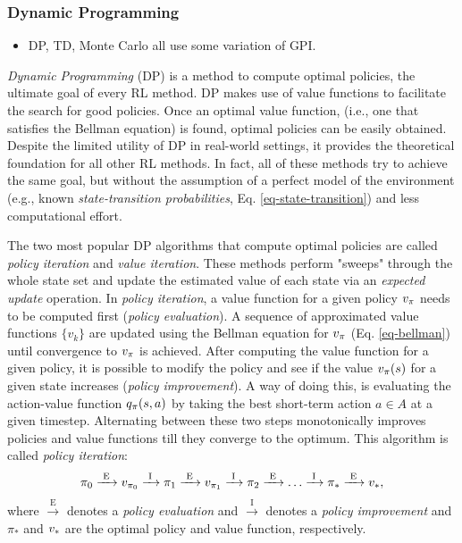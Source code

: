 \documentclass[a4paper, twoside, 12pt]{article}
\begin{document}
\subsubsection{Dynamic Programming}
\label{sec:org52f4b8e}
\begin{itemize}
\item DP, TD, Monte Carlo all use some variation of GPI.
\end{itemize}

\emph{Dynamic Programming} (DP) is a method to compute optimal policies, the ultimate
goal of every RL method. DP makes use of value functions to facilitate the
search for good policies. Once an optimal value function, (i.e., one that
satisfies the Bellman equation) is found, optimal policies can be easily
obtained. Despite the limited utility of DP in real-world settings, it provides
the theoretical foundation for all other RL methods. In fact, all of these
methods try to achieve the same goal, but without the assumption of a perfect
model of the environment (e.g., known \emph{state-transition probabilities}, Eq.
\ref{eq-state-transition}) and less computational effort.

The two most popular DP algorithms that compute optimal policies are called
\emph{policy iteration} and \emph{value iteration}. These methods perform "sweeps" through
the whole state set and update the estimated value of each state via an
\emph{expected update} operation. In \emph{policy iteration}, a value function for a given
policy \(v_\pi\) needs to be computed first (\emph{policy evaluation}). A sequence of
approximated value functions \(\{v_k\}\) are updated using the Bellman equation
for \(v_\pi\) (Eq. \ref{eq-bellman}) until convergence to \(v_\pi\) is achieved. After
computing the value function for a given policy, it is possible to modify the
policy and see if the value \(v_\pi(s)\) for a given state increases (\emph{policy
improvement}). A way of doing this, is evaluating the action-value function
\(q_\pi(s,a)\) by taking the best short-term action \(a\!\in\!A\) at a given
timestep. Alternating between these two steps monotonically improves policies
and value functions till they converge to the optimum. This algorithm is called
\emph{policy iteration}:
\begin{equation}
    \pi_0 \xrightarrow{\text{ E }} v_{\pi_0} \xrightarrow{\text{ I }}
    \pi_1 \xrightarrow{\text{ E }} v_{\pi_1} \xrightarrow{\text{ I }}
    \pi_2 \xrightarrow{\text{ E }} \hdots \xrightarrow{\text{ I }}
    \pi_* \xrightarrow{\text{ E }} v_*,
\end{equation}
where \(\xrightarrow{\text{ E }}\) denotes a \emph{policy evaluation} and
\(\xrightarrow{\text{ I }}\) denotes a \emph{policy improvement} and \(\pi_*\) and
\(v_*\) are the optimal policy and value function, respectively.
\end{document}
